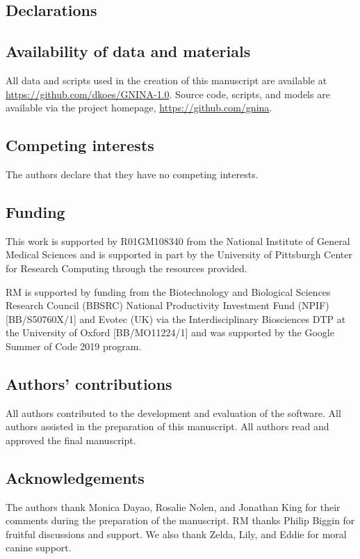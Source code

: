 \documentclass[linenumbers,doublespacing]{bmcart}
\begin{document}
\begin{backmatter}




\section*{Declarations}
\subsection*{Availability of data and materials}
All data and scripts used in the creation of this manuscript are available at \url{https://github.com/dkoes/GNINA-1.0}.  Source code, scripts, and models are available via the project homepage, \url{https://github.com/gnina}. 

\subsection*{Competing interests}
The authors declare that they have no competing interests.

\subsection*{Funding}
This work is supported by R01GM108340 from the National Institute of General Medical Sciences and is supported in part by the University of Pittsburgh Center for Research Computing through the resources provided.

RM is supported  by  funding  from  the  Biotechnology  and  Biological  Sciences  Research Council (BBSRC) National Productivity Investment Fund (NPIF) [BB/S50760X/1] and Evotec (UK) via the Interdisciplinary Biosciences DTP at the University of Oxford [BB/MO11224/1] and was supported by the Google Summer of Code 2019 program.

\subsection*{Authors' contributions}
 All authors contributed to the development and evaluation of the software. All authors assisted in the preparation of this manuscript. All authors read and approved the final manuscript.
 
\subsection*{Acknowledgements}
The authors thank Monica Dayao, Rosalie Nolen, and Jonathan King for their comments during the preparation of the manuscript. RM thanks Philip Biggin for fruitful discussions and support. We also thank Zelda, Lily, and Eddie for moral canine support.




\end{backmatter}
\end{document}
